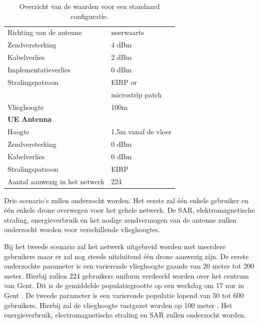 \documentclass[twocolumn]{phdsymp_dutch}
\begin{document}
\begin{table}[!htb]
\begin{tabular}[t]{ll}
        \hspace{3mm}  Richting van de antenne   & neerwaarts   \\ 
        \hspace{3mm}  Zendversterking           & 4 dBm   \\ 
        \hspace{3mm}  Kabelverlies               & 2 dBm   \\ 
        \hspace{3mm}  Implementatieverlies       & 0 dBm   \\
        \hspace{3mm}  Stralingspatroon         & EIRP or\\
         \hspace{3mm}                           & microstrip patch\\
        \hspace{3mm}  Vlieghoogte                & 100m  \\
        \hline
        \multicolumn{2}{l}{\textbf{UE Antenna}} \\
        \hline 
        \hspace{3mm} Hoogte                     & 1.5m vanaf de vloer      \\ 
        \hspace{3mm} Zendversterking                      & 0 dBm   \\ 
        \hspace{3mm} Kabelverlies              & 0 dBm   \\ 
        \hspace{3mm} Stralingspatroon         & EIRP  \\
        \hspace{3mm} Aantal aanwezig in het netwerk         & 224  \\
        \toprule
\end{tabular}
\caption{Overzicht van de waarden voor een standaard configuratie.}
\label{table:defaultconf}
\end{table}

Drie scenario's zullen onderzocht worden. Het eerste zal \'e\'en enkele gebruiker en 
 \'e\'en enkele drone overwegen 
voor het gehele netwerk. De \gls{SAR}, elektromagnetische straling, energieverbruik  en 
het nodige zendvermogen van de antenne zullen onderzocht worden voor verschillende vlieghoogtes.

Bij het tweede scenario zal het netwerk uitgebreid worden met meerdere gebruikers maar 
er zal nog steeds uitsluitend  \'e\'en drone aanwezig zijn. De eerste onderzochte parameter 
is een varierende vlieghoogte gaande van 20 meter tot 200 meter. Hierbij zullen 224 gebruikers 
uniform verdeerld worden over het centrum van Gent. Dit is de gemiddelde populatiegrootte op 
een werkdag om 17 uur in Gent \cite{J2}.
De tweede parameter is een varierende populatie lopend van 50 tot 600 gebruikers. Hierbij 
zal de vlieghoogte vastgezet worden op 100 meter \cite{J2}.
Het energieverbruik, electromagnetische straling en \gls{SAR} zullen onderzocht worden.
\end{document}
